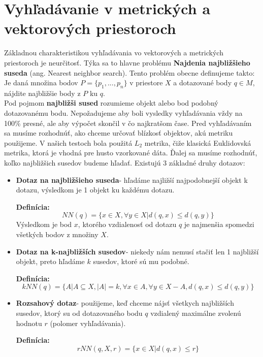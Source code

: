\documentclass[12pt,oneside]{fithesis2}
\begin{document}
   \section{Vyhľadávanie v metrických a vektorových priestoroch}
   Základnou charakteristikou vyhľadávania vo vektorových a metrických priestoroch je neurčitosť. Týka sa to hlavne problému \textbf{Najdenia najbližšieho suseda} (ang. Nearest neighbor search). Tento problém obecne definujeme takto: \\
   Je daná množina bodov $P=\{p_1,...,p_n\}$ v priestore $X$ a dotazované body $q \in M$, nájdite najbližšie body z $P$ ku $q$.\\
   Pod pojmom \textbf{najbližši sused} rozumieme objekt alebo bod podobný dotazovanému bodu. Nepožadujeme aby boli vysledky vyhľadávania vždy na 100\% presné, ale aby výpočet skončil v čo najkratšom čase.
   Pred vyhľadávaním sa musíme rozhodnúť, ako chceme určovať blízkosť objektov, akú metriku použijeme. V našich testoch bola použitá $L_2$ metrika, čiže klasická Euklidovská metrika, ktorá je vhodná pre husto vzorkované dáta. Ďalej sa musíme rozhodnúť, koľko najbližšich susedov budeme hľadať. Existujú 3 základné druhy dotazov:
   \begin{itemize}
   \item \textbf{Dotaz na najbližšieho suseda}- hľadáme najližší najpodobnejší objekt k dotazu, výsledkom je 1 objekt ku každému dotazu.
   
   \textbf{Definícia:}
   \begin{equation*}
   NN(q)=\{x \in X, \forall y \in X| d(q,x)\leq d(q,y) \}
   \end{equation*}
Výsledkom je bod $x$, ktorého vzdialenosť od dotazu $q$ je najmenšia spomedzi všetkých bodov z množiny $X$.
   \item \textbf{Dotaz na k-najbližších susedov}- niekedy nám nemusí stačiť len 1 najbližší objekt, preto hľadáme $k$ susedov, ktoré sú mu podobné.
   
   \textbf{Definícia:}
   \begin{equation*}
   kNN(q)=\{A|A \subseteq X,|A|=k,\forall x \in A,\forall y \in X - A,d(q,x)\leq d(q,y)\}
   \end{equation*}    
   \item \textbf{Rozsahový dotaz}- použijeme, keď chceme nájsť všetkych najbližších susedov, ktorý su od dotazovaného bodu $q$ vzdialený maximálne zvolenú hodnotu $r$ (polomer vyhľadávania).
   
   \textbf{Definícia:} %
   \begin{equation*} 
  rNN(q,X,r)=\{ x \in X|d(q,x)\leq r \}
   \end{equation*}  
   \end{itemize}
   
\end{document}
